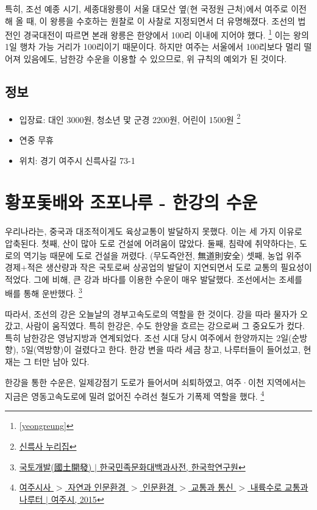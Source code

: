 특히, 조선 예종 시기, 세종대왕릉이 서울 대모산 옆(현 국정원 근처)에서 여주로 이전해 올 때,
이 왕릉을 수호하는 원찰로 이 사찰로 지정되면서 더 유명해졌다.
조선의 법전인 경국대전이 따르면 본래 왕릉은 한양에서 100리 이내에 지어야 했다. 
\footnote{\ref{yeongreung}}
이는 왕의 1일 행차 가능 거리가 100리이기 때문이다.
하지만 여주는 서울에서 100리보다 멀리 떨어져 있음에도, 남한강 수운을 이용할 수 있으므로,
위 규칙의 예외가 된 것이다.

\subsection{정보}
\begin{itemize}
    \item 입장료: 대인 3000원, 청소년 맟 군경 2200원, 어린이 1500원 
    \footnote{\href{http://www.silleuksa.org/}{신륵사 누리집}}
    \item 연중 무휴
    \item 위치: 경기 여주시 신륵사길 73-1
\end{itemize}

\section{황포돛배와 조포나루 - 한강의 수운}

우리나라는, 중국과 대조적이게도 육상교통이 발달하지 못했다. 이는 세 가지 이유로 압축된다.
첫째, 산이 많아 도로 건설에 어려움이 많았다. 
둘째, 침략에 취약하다는, 도로의 역기능 때문에 도로 건설을 꺼렸다. (무도즉안전, 無道則安全)
셋째, 농업 위주 경제$+$적은 생산량과 작은 국토로써 상공업의 발달이 지연되면서 도로 교통의 필요성이 적었다.
그에 비해, 큰 강과 바다를 이용한 수운이 매우 발달했다. 조선에서는 조세를 배를 통해 운반했다. 
\footnote{\href{http://encykorea.aks.ac.kr/Contents/Item/E0006539}{국토개발(國土開發) $|$ 한국민족문화대백과사전, 한국학연구원}}


따라서, 조선의 강은 오늘날의 경부고속도로의 역할을 한 것이다. 강을 따라 물자가 오갔고, 사람이 움직였다.
특히 한강은, 수도 한양을 흐르는 강으로써 그 중요도가 컸다. 특히 남한강은 영남지방과 연계되었다. 
조선 시대 당시 여주에서 한양까지는 2일(순방향), 5일(역방향)이 걸렸다고 한다.
한강 변을 따라 세금 창고, 나루터들이 들어섰고, 현재는 그 터만 남아 있다.


한강을 통한 수운은, 일제강점기 도로가 들어서며 쇠퇴하였고, 
여주·이천 지역에서는 지금은 영동고속도로에 밀려 없어진 수려선 철도가 기폭제 역할을 했다.
\footnote{ \href{https://www.yeoju.go.kr/history/jsp/Theme/Theme.jsp?BC_ID=a0085}{여주시사 $>$ 자연과 인문환경 $>$ 인문환경 $>$ 교통과 통신 $>$ 내륙수로 교통과 나루터 $|$ 여주시, 2015}}


